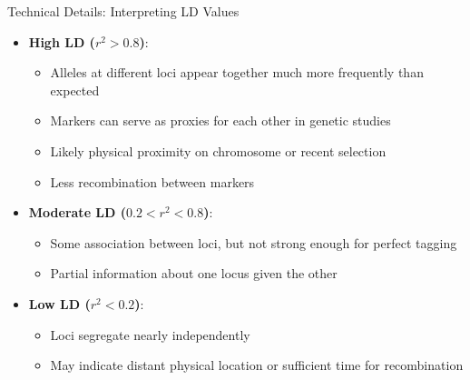 \begin{frame}{Technical Details: Interpreting LD Values}

\begin{itemize}
\item \textbf{High LD ($r^2 > 0.8$)}:
\begin{itemize}
\item Alleles at different loci appear together much more frequently than expected
\item Markers can serve as proxies for each other in genetic studies
\item Likely physical proximity on chromosome or recent selection
\item Less recombination between markers
\end{itemize}
\end{itemize}

\begin{itemize}
\item \textbf{Moderate LD ($0.2 < r^2 < 0.8$)}:
\begin{itemize}
\item Some association between loci, but not strong enough for perfect tagging
\item Partial information about one locus given the other
\end{itemize}
\end{itemize}

\begin{itemize}
\item \textbf{Low LD ($r^2 < 0.2$)}:
\begin{itemize}
\item Loci segregate nearly independently
\item May indicate distant physical location or sufficient time for recombination
\end{itemize}
\end{itemize}

\end{frame}

